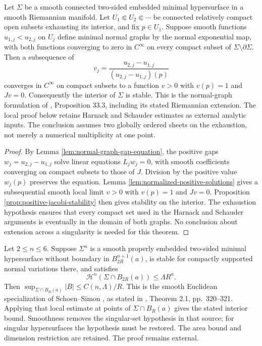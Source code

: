 \begin{theorem}\label{thm:separated-sheets-jacobi}
Let $\Sigma$ be a smooth connected two-sided embedded minimal hypersurface in a smooth Riemannian manifold. Let $U_1\Subset U_2\Subset\cdots$ be connected relatively compact open subsets exhausting its interior, and fix $p\in U_1$. Suppose smooth functions $u_{1,j}<u_{2,j}$ on $U_j$ define minimal normal graphs by the normal exponential map, with both functions converging to zero in $C^\infty$ on every compact subset of $\Sigma\setminus\partial\Sigma$. Then a subsequence of
\[
 v_j=\frac{u_{2,j}-u_{1,j}}{(u_{2,j}-u_{1,j})(p)}
\]
converges in $C^\infty$ on compact subsets to a function $v>0$ with $v(p)=1$ and $Jv=0$. Consequently the interior of $\Sigma$ is stable. This is the normal-graph formulation of \cite{ChMin}, Proposition 33.3, including its stated Riemannian extension. The local proof below retains Harnack and Schauder estimates as external analytic inputs. The conclusion assumes two globally ordered sheets on the exhaustion, not merely a numerical multiplicity at one point.
\end{theorem}
\begin{proof}
By Lemma \ref{lem:normal-graph-gap-equation}, the positive gaps $w_j=u_{2,j}-u_{1,j}$ solve linear equations $L_jw_j=0$, with smooth coefficients converging on compact subsets to those of $J$. Division by the positive value $w_j(p)$ preserves the equation. Lemma \ref{lem:normalized-positive-solutions} gives a subsequential smooth local limit $v>0$ with $v(p)=1$ and $Jv=0$. Proposition \ref{prop:positive-jacobi-stability} then gives stability on the interior. The exhaustion hypothesis ensures that every compact set used in the Harnack and Schauder arguments is eventually in the domain of both graphs. No conclusion about extension across a singularity is needed for this theorem.
\end{proof}

\begin{theorem}\label{thm:stable-curvature-bound}
Let $2\leq n\leq6$. Suppose $\Sigma^n$ is a smooth properly embedded two-sided minimal hypersurface without boundary in $B_{2R}^{n+1}(a)$, is stable for compactly supported normal variations there, and satisfies
\[
 \mathcal H^n(\Sigma\cap B_{2R}(a))\leq\Lambda R^n.
\]
Then $\sup_{\Sigma\cap B_R(a)}|B|\leq C(n,\Lambda)/R$. This is the smooth Euclidean specialization of Schoen--Simon \cite{SS81}, as stated in \cite{Sharp17}, Theorem 2.1, pp.~320--321. Applying that local estimate at points of $\Sigma\cap B_R(a)$ gives the stated interior bound. Smoothness removes the singular-set hypothesis in that source; for singular hypersurfaces the hypothesis must be restored. The area bound and dimension restriction are retained. The proof remains external.
\end{theorem}
